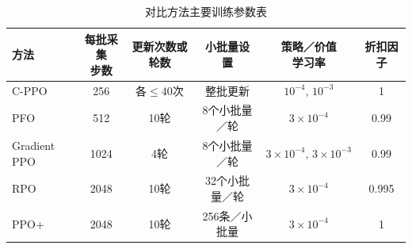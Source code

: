 \begin{table}[H]
 \centering
 \captionsetup{skip=8bp,belowskip=0pt}
 \caption{对比方法主要训练参数表}
 \label{tab:ch3-baseline-settings}
 \begingroup\small
 \setlength{\tabcolsep}{4pt}
 \begin{tabular}{lccccc}
  \toprule
  方法 & \shortstack{每批采集\\步数} & 更新次数或轮数 & 小批量设置 & \shortstack{策略／价值\\学习率} & 折扣因子 \\
  \midrule
  C-PPO & 256 & 各\(\le40\)次 & 整批更新 & \(10^{-4},\,10^{-3}\) & 1 \\
  PFO & 512 & 10轮 & 8个小批量／轮 & \(3\times10^{-4}\) & 0.99 \\
  Gradient PPO & 1024 & 4轮 & 8个小批量／轮 & \(3\times10^{-4},\,3\times10^{-3}\) & 0.99 \\
  RPO & 2048 & 10轮 & 32个小批量／轮 & \(3\times10^{-4}\) & 0.995 \\
  PPO+ & 2048 & 10轮 & 256条／小批量 & \(3\times10^{-4}\) & 1 \\
  \bottomrule
 \end{tabular}
 \endgroup
\end{table}

